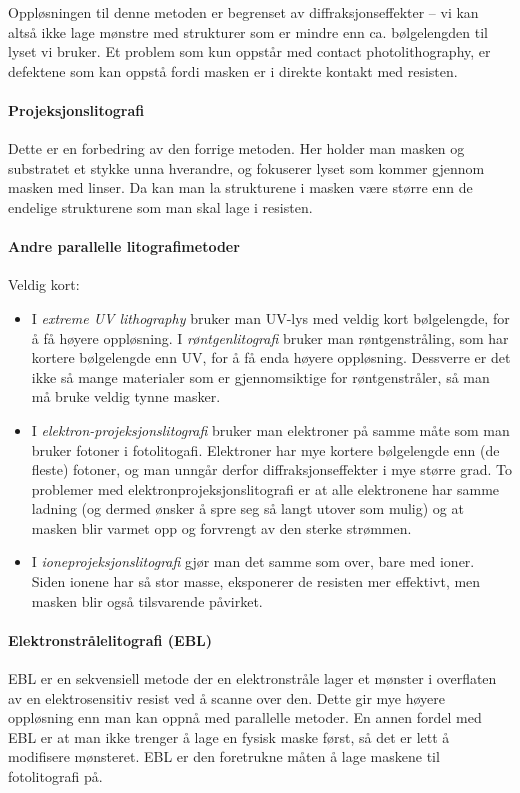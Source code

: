 Oppløsningen til denne metoden er begrenset av diffraksjonseffekter -- vi kan altså ikke lage mønstre med strukturer som er mindre enn ca. bølgelengden til lyset vi bruker. Et problem som kun oppstår med contact photolithography, er defektene som kan oppstå fordi masken er i direkte kontakt med resisten.

\paragraph{Projeksjonslitografi} Dette er en forbedring av den forrige metoden. Her holder man masken og substratet et stykke unna hverandre, og fokuserer lyset som kommer gjennom masken med linser. Da kan man la strukturene i masken være større enn de endelige strukturene som man skal lage i resisten. 

\paragraph{Andre parallelle litografimetoder} Veldig kort:
\begin{itemize}
	\item I \emph{extreme UV lithography} bruker man UV-lys med veldig kort bølgelengde, for å få høyere oppløsning.  I \emph{røntgenlitografi} bruker man røntgenstråling, som har kortere bølgelengde enn UV, for å få enda høyere oppløsning. Dessverre er det ikke så mange materialer som er gjennomsiktige for røntgenstråler, så man må bruke veldig tynne masker.
	\item I \emph{elektron-projeksjonslitografi} bruker man elektroner på samme måte som man bruker fotoner i fotolitogafi. Elektroner har mye kortere bølgelengde enn (de fleste) fotoner, og man unngår derfor diffraksjonseffekter i mye større grad. To problemer med elektronprojeksjonslitografi er at alle elektronene har samme ladning (og dermed ønsker å spre seg så langt utover som mulig) og at masken blir varmet opp og forvrengt av den sterke strømmen.
	\item I \emph{ioneprojeksjonslitografi} gjør man det samme som over, bare med ioner. Siden ionene har så stor masse, eksponerer de resisten mer effektivt, men masken blir også tilsvarende påvirket.
\end{itemize}

\paragraph{Elektronstrålelitografi (EBL)} EBL er en sekvensiell metode der en elektronstråle lager et mønster i overflaten av en elektrosensitiv resist ved å scanne over den. Dette gir mye høyere oppløsning enn man kan oppnå med parallelle metoder. En annen fordel med EBL er at man ikke trenger å lage en fysisk maske først, så det er lett å modifisere mønsteret. EBL er den foretrukne måten å lage maskene til fotolitografi på.

